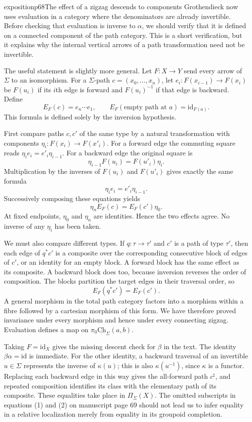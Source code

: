 \begin{dcomment}{exposition}{p68}{The effect of a zigzag descends to components}
Grothendieck now uses evaluation in a category where the denominators are already invertible. Before checking that evaluation is inverse to $\alpha$, we should verify that it is defined on a connected component of the path category. This is a short verification, but it explains why the internal vertical arrows of a path transformation need not be invertible.

The useful statement is slightly more general. Let $F:X\to Y$ send every arrow of $\Sigma$ to an isomorphism. For a $\Sigma$-path
$c=(x_0,\ldots,x_n)$, let
$e_i:F(x_{i-1})\to F(x_i)$ be $F(u_i)$ if its $i$th edge is forward and $F(u_i)^{-1}$ if that edge is backward. Define
\[
 E_F(c)=e_n\cdots e_1,
 \qquad E_F(\text{empty path at }a)=\mathrm{id}_{F(a)}.
\]
This formula is defined solely by the inversion hypothesis.

First compare paths $c,c'$ of the same type by a natural transformation with components $\eta_i:F(x_i)\to F(x'_i)$. For a forward edge the commuting square reads
$\eta_i e_i=e'_i\eta_{i-1}$. For a backward edge the original square is
\[
 \eta_{i-1}F(u_i)=F(u'_i)\eta_i.
\]
Multiplication by the inverses of $F(u_i)$ and $F(u'_i)$ gives exactly the same formula
\[
 \eta_i e_i=e'_i\eta_{i-1}.
\]
Successively composing these equations yields
\[
 \eta_n E_F(c)=E_F(c')\eta_0.
\]
At fixed endpoints, $\eta_0$ and $\eta_n$ are identities. Hence the two effects agree. No inverse of any $\eta_i$ has been taken.

We must also compare different types. If $q:\tau\to\tau'$ and $c'$ is a path of type $\tau'$, then each edge of $q^*c'$ is a composite over the corresponding consecutive block of edges of $c'$, or an identity for an empty block. A forward block has the same effect as its composite. A backward block does too, because inversion reverses the order of composition. The blocks partition the target edges in their traversal order, so
\[
 E_F(q^*c')=E_F(c').
\]
A general morphism in the total path category factors into a morphism within a fibre followed by a cartesian morphism of this form. We have therefore proved invariance under every morphism and hence under every connecting zigzag. Evaluation defines a map on $\pi_0\underline{\mathrm{Ch}}_\Sigma(a,b)$.

Taking $F=\mathrm{id}_X$ gives the missing descent check for $\beta$ in the text. The identity $\beta\alpha=\mathrm{id}$ is immediate. For the other identity, a backward traversal of an invertible $u\in\Sigma$ represents the inverse of $\kappa(u)$; this is also $\kappa(u^{-1})$, since $\kappa$ is a functor. Replacing each backward edge in this way gives the all-forward path $c^\natural$, and repeated composition identifies its class with the elementary path of its composite. These equalities take place in $\Pi_\Sigma(X)$. The omitted subscripts in equations (1) and (2) on manuscript page 69 should not lead us to infer equality in a relative localization merely from equality in its groupoid completion.
\end{dcomment}

